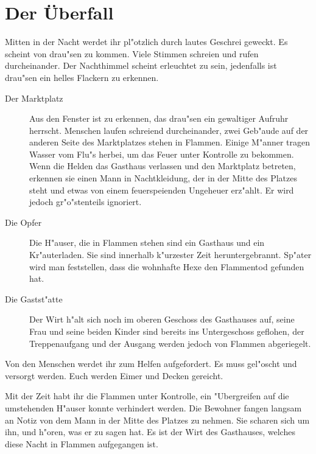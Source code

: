 \chapter{Der Überfall}
\par Mitten in der Nacht werdet ihr pl"otzlich durch lautes Geschrei geweckt. Es scheint von drau"sen zu kommen. Viele Stimmen schreien und rufen durcheinander. Der Nachthimmel scheint erleuchtet zu sein, jedenfalls ist drau"sen ein helles Flackern zu erkennen.

\begin{description}
\item [Der Marktplatz] Aus den Fenster ist zu erkennen, das drau"sen ein gewaltiger Aufruhr herrscht. Menschen laufen schreiend durcheinander, zwei Geb"aude auf der anderen Seite des Marktplatzes stehen in Flammen. Einige M"anner tragen Wasser vom Flu"s herbei, um das Feuer unter Kontrolle zu bekommen.\\
Wenn die Helden das Gasthaus verlassen und den Marktplatz betreten, erkennen sie einen Mann in Nachtkleidung, der in der Mitte des Platzes steht und etwas von einem feuerspeienden Ungeheuer erz"ahlt. Er wird jedoch gr"o"stenteils ignoriert.
\item [Die \glqq Opfer\grqq{}] Die H"auser, die in Flammen stehen sind ein Gasthaus und ein Kr"auterladen. Sie sind innerhalb k"urzester Zeit heruntergebrannt. Sp"ater wird man feststellen, dass die wohnhafte Hexe den Flammentod gefunden hat.
\item[Die Gastst"atte] Der Wirt h"alt sich noch im oberen Geschoss des Gasthauses auf, seine Frau und seine beiden Kinder sind bereits ins Untergeschoss geflohen, der Treppenaufgang und der Ausgang werden jedoch von Flammen abgeriegelt.
\end{description}

\par Von den Menschen werdet ihr zum Helfen aufgefordert. Es muss gel"oscht und versorgt werden. Euch werden Eimer und Decken gereicht.
\par Mit der Zeit habt ihr die Flammen unter Kontrolle, ein "Ubergreifen auf die umstehenden H"auser konnte verhindert werden. Die Bewohner fangen langsam an Notiz von dem Mann in der Mitte des Platzes zu nehmen. Sie scharen sich um ihn, und h"oren, was er zu sagen hat. Es ist der Wirt des Gasthauses, welches diese Nacht in Flammen aufgegangen ist.

